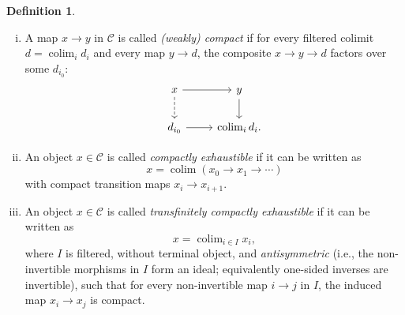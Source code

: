 \documentclass[draft]{amsart}
\newcommand{\cat}[1]{\mathcal{#1}}
\DeclareMathOperator*{\colim}{colim}
\theoremstyle{definition}
\newtheorem{defn}[thm]{Definition}
\begin{document}
\begin{defn}
\begin{enumerate}[(i)]
\item A map $x\to y$ in $\cat C$ is called \emph{(weakly) compact} if for every filtered colimit $d = \colim_i d_i$ and every map $y\to d$, the composite $x\to y\to d$ factors over some $d_{i_0}$:
\[
\begin{tikzcd}
x \ar[d,dashed] \ar[r] & y \ar[d] \\
d_{i_0} \ar[r] & \colim_i d_i.
\end{tikzcd}
\]

\item An object $x \in \cat C$ is called \emph{compactly exhaustible} if it can be written as
\[
x = \colim (x_0\to x_1\to \dotsb)
\]
with compact transition maps $x_i\to x_{i+1}$.

\item An object $x\in \cat C$ is called \emph{transfinitely compactly exhaustible} if it can be written as
\[
x = \colim_{i\in I} x_i,
\]
where $I$ is filtered, without terminal object, and \emph{antisymmetric} (i.e., the non-invertible morphisms in $I$ form an ideal; equivalently one-sided inverses are invertible), such that for every non-invertible map $i\to j$ in $I$, the induced map $x_i\to x_j$ is compact.
\end{enumerate}
\end{defn}
\end{document}

